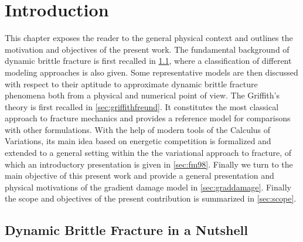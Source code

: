 \chapter{Introduction} \label{chap:introduction}
\minitoc

This chapter exposes the reader to the general physical context and outlines the motivation and objectives of the present work. The fundamental background of dynamic brittle fracture is first recalled in \cref{sec:dynafrac}, where a classification of different modeling approaches is also given. Some representative models are then discussed with respect to their aptitude to approximate dynamic brittle fracture phenomena both from a physical and numerical point of view. The Griffith's theory is first recalled in \cref{sec:griffithfreund}. It constitutes the most classical approach to fracture mechanics and provides a reference model for comparisons with other formulations. With the help of modern tools of the Calculus of Variations, its main idea based on energetic competition is formalized and extended to a general setting within the the variational approach to fracture, of which an introductory presentation is given in \cref{sec:fm98}. Finally we turn to the main objective of this present work and provide a general presentation and physical motivations of the gradient damage model in \cref{sec:graddamage}. Finally the scope and objectives of the present contribution is summarized in \cref{sec:scope}.

\section{Dynamic Brittle Fracture in a Nutshell} \label{sec:dynafrac}
